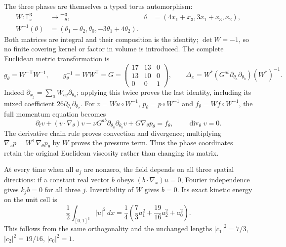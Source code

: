 The three phases are themselves a typed torus automorphism:
\begin{align*}
 W:\mathbb T_x^3&\longrightarrow\mathbb T_\theta^3,
 &\theta&=(4x_1+x_3,3x_1+x_3,x_2),\\
 W^{-1}(\theta)&=(\theta_1-\theta_2,\theta_0,
                         -3\theta_1+4\theta_2).
\end{align*}
Both matrices are integral and their composition is the identity;
$\det W=-1$, so no finite covering kernel or factor in volume is
introduced. The complete Euclidean metric transformation is
\begin{equation}
 g_\theta=W^{-\mathsf T}W^{-1},\qquad
 g_\theta^{-1}=WW^{\mathsf T}=
 G=\begin{pmatrix}17&13&0\\13&10&0\\0&0&1\end{pmatrix},\qquad
 \Delta_x=W^*(G^{ab}\partial_{\theta_a}\partial_{\theta_b})(W^*)^{-1}.
 \label{s6f:metric}
\end{equation}
Indeed $\partial_{x_j}=\sum_aW_{aj}\partial_{\theta_a}$;
applying this twice proves the last identity, including its mixed
coefficient $26\partial_{\theta_1}\partial_{\theta_2}$. For
$v= W u\circ W^{-1}$, $p_\theta=p\circ W^{-1}$ and
$f_\theta=W f\circ W^{-1}$, the full momentum equation becomes
\[
 \partial_tv+(v\cdot\nabla_\theta)v
 -\nu G^{ab}\partial_{\theta_a}\partial_{\theta_b}v
 +G\nabla_\theta p_\theta=f_\theta,\qquad
 \operatorname{div}_\theta v=0.
\]
The derivative chain rule proves convection and divergence; multiplying
$\nabla_xp=W^{\mathsf T}\nabla_\theta p_\theta$ by $W$ proves
the pressure term. Thus the phase coordinates retain the original
Euclidean viscosity rather than changing its matrix.

At every time when all $a_j$ are nonzero, the field depends on all
three spatial directions: if a constant real vector $b$ obeys
$(b\cdot\nabla_x)u=0$, Fourier independence gives $k_jb=0$ for
all three $j$. Invertibility of $W$ gives $b=0$. Its exact kinetic
energy on the unit cell is
\begin{equation}
 \frac12\int_{[0,1]^3}|u|^2\,dx
 =\frac14\left(\frac73a_1^2+\frac{19}{16}a_2^2+a_0^2\right).
 \label{s6f:energy}
\end{equation}
This follows from the same orthogonality and the unchanged lengths
$|c_1|^2=7/3$, $|c_2|^2=19/16$, $|c_0|^2=1$.

